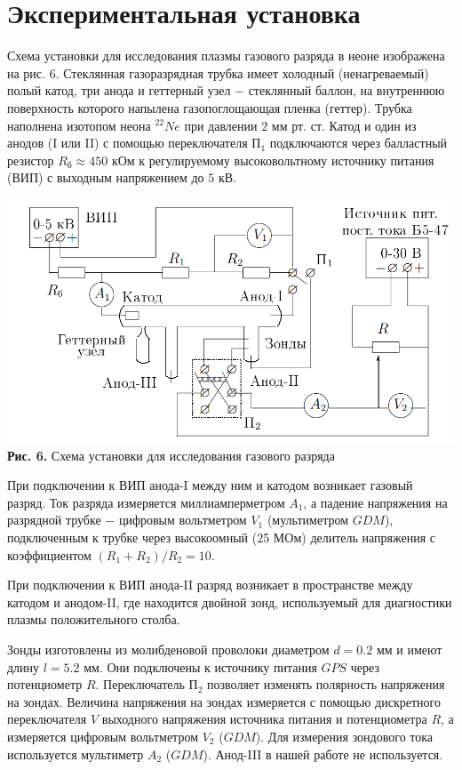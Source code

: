 \documentclass[a4paper,12pt]{article} %
\begin{document}
\section{Экспериментальная установка}
\hfill \break Схема установки для исследования плазмы газового разряда в неоне изображена на рис. 6. Стеклянная газоразрядная трубка имеет холодный (ненагреваемый) полый катод, три анода и геттерный узел $-$ стеклянный баллон, на внутреннюю поверхность которого напылена газопоглощающая пленка (геттер). Трубка наполнена изотопом неона $^{22}Ne$ при давлении $2$ мм рт. ст. Катод и один из анодов (I или II) с помощью переключателя $\text{П}_{1}$ подключаются через балластный резистор $R_\text{б} \approx 450$ кОм к регулируемому высоковольтному источнику питания (ВИП) с выходным напряжением до $5$ кВ.

\begin{center}
\includegraphics[width=0.75\linewidth]{3.5.1_6.png}\\
\textbf{Рис. 6.} Схема установки для исследования газового разряда\\
\end{center}

\hfill \break При подключении к ВИП анода-I между ним и катодом возникает газовый разряд. Ток разряда измеряется миллиамперметром $A_{1}$, а падение напряжения на разрядной трубке $-$ цифровым вольтметром $V_{1}$ (мультиметром $GDM$), подключенным к трубке через высокоомный ($2$5 МОм) делитель напряжения с коэффициентом $(R_{1}+R_{2})/R_{2} = 10$.

\hfill \break При подключении к ВИП анода-II разряд возникает в пространстве между катодом и анодом-II, где находится двойной зонд, используемый для диагностики плазмы положительного столба.

\hfill \break Зонды изготовлены из молибденовой проволоки диаметром $d = 0.2$ мм и имеют длину $l = 5.2$ мм. Они подключены к источнику питания $GPS$ через потенциометр $R$. Переключатель $\text{П}_{2}$ позволяет изменять полярность напряжения на зондах. Величина напряжения на зондах измеряется с помощью дискретного переключателя $V$ выходного напряжения источника питания и потенциометра $R$, а измеряется цифровым вольтметром $V_{2}$ ($GDM$). Для измерения зондового тока используется мультиметр $A_{2}$ ($GDM$). Анод-III в нашей работе не используется.
\end{document}

